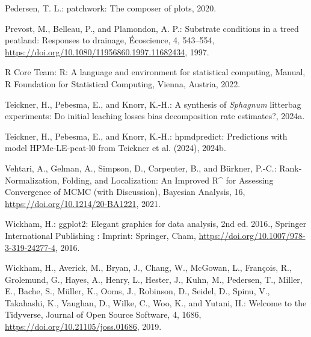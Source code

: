 \documentclass[
  12pt,
]{article}
\newlength{\cslhangindent}
\newlength{\cslentryspacingunit} %
\newenvironment{CSLReferences}[2] %
 {%
  \setlength{\parindent}{0pt}
  \ifodd #1
  \let\oldpar\par
  \def\par{\hangindent=\cslhangindent\oldpar}
  \fi
  \setlength{\parskip}{#2\cslentryspacingunit}
 }%
 {}
\begin{document}
\begin{CSLReferences}{0}{0}
\leavevmode{}%
Pedersen, T. L.: {patchwork}: {The} composer of plots, 2020.

\leavevmode{}%
Prevost, M., Belleau, P., and Plamondon, A. P.: Substrate conditions in a treed peatland: {Responses} to drainage, {É}coscience, 4, 543--554, \url{https://doi.org/10.1080/11956860.1997.11682434}, 1997.

\leavevmode{}%
R Core Team: R: {A} language and environment for statistical computing, Manual, R Foundation for Statistical Computing, Vienna, Austria, 2022.

\leavevmode{}%
Teickner, H., Pebesma, E., and Knorr, K.-H.: A synthesis of {\emph{Sphagnum}} litterbag experiments: {Do} initial leaching losses bias decomposition rate estimates?, 2024a.

\leavevmode{}%
Teickner, H., Pebesma, E., and Knorr, K.-H.: {hpmdpredict}: {Predictions} with model {HPMe-LE-peat-l0} from {Teickner} et al. (2024), 2024b.

\leavevmode{}%
Vehtari, A., Gelman, A., Simpson, D., Carpenter, B., and Bürkner, P.-C.: Rank-{Normalization}, {Folding}, and {Localization}: {An Improved R{\^{}}} for {Assessing Convergence} of {MCMC} (with {Discussion}), Bayesian Analysis, 16, \url{https://doi.org/10.1214/20-BA1221}, 2021.

\leavevmode{}%
Wickham, H.: {ggplot2}: {Elegant} graphics for data analysis, 2nd ed. 2016., Springer International Publishing : Imprint: Springer, Cham, \url{https://doi.org/10.1007/978-3-319-24277-4}, 2016.

\leavevmode{}%
Wickham, H., Averick, M., Bryan, J., Chang, W., McGowan, L., François, R., Grolemund, G., Hayes, A., Henry, L., Hester, J., Kuhn, M., Pedersen, T., Miller, E., Bache, S., Müller, K., Ooms, J., Robinson, D., Seidel, D., Spinu, V., Takahashi, K., Vaughan, D., Wilke, C., Woo, K., and Yutani, H.: Welcome to the {Tidyverse}, Journal of Open Source Software, 4, 1686, \url{https://doi.org/10.21105/joss.01686}, 2019.

\end{CSLReferences}
\end{document}
